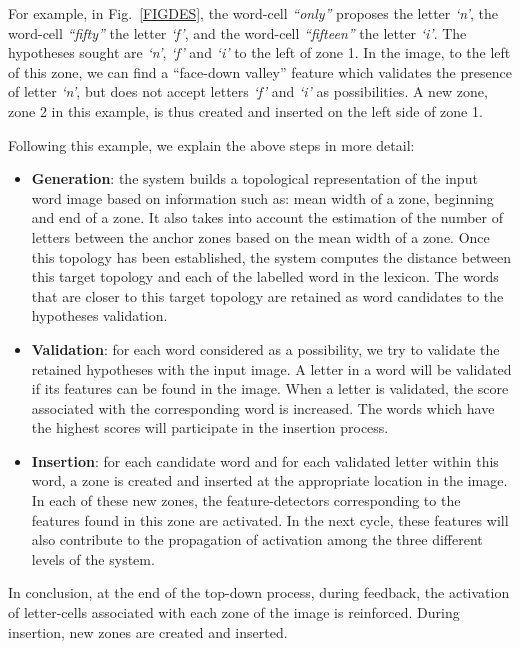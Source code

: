 \documentclass[ijdar]{svjour}
\begin{document}
For example, in Fig.~\ref{FIGDES}, the word-cell {\it ``only''} proposes the letter {\it `n'}, the word-cell {\it ``fifty''} the letter {\it `f'}, and the word-cell {\it ``fifteen''} the letter {\it `i'}.
The hypotheses sought are {\it `n'}, {\it `f'} and {\it `i'} to the left of zone 1.
In the image, to the left of this zone, we can find a ``face-down valley'' feature which validates the presence of letter {\it `n'}, but does not accept letters {\it `f'} and {\it `i'} as possibilities.
A new zone, zone 2 in this example, is thus created and inserted on the left side of zone 1.

Following this example, we explain the above steps in more detail:

\begin{itemize}
\item {\bf Generation}: the system builds a topological representation of the input word image based on information such as:  mean width of a zone, beginning and end of a zone.
It also takes into account the estimation of the number of letters between the anchor zones based on the mean width of a zone.
Once this topology has been established, the system computes the distance between this target topology and each of the labelled word in the lexicon.
The words that are closer to this target topology are retained as word candidates to the hypotheses validation.

\vskip 4mm

\item {\bf Validation}: for each word considered as a possibility, we try to validate the retained hypotheses with the input image.
A letter in a word will be validated if its features can be found in the image.
When a letter is validated, the score associated with the corresponding word is increased.
The words which have the highest scores will participate in the insertion process.

\vskip 4mm

\item {\bf Insertion}: for each candidate word and for each validated letter within this word, a zone is created and inserted at the appropriate location in the image.
In each of these new zones, the feature-detectors corresponding to the features found in this zone are activated.
In the next cycle, these features will also contribute to the propagation of activation among the three different levels of the system.
\end{itemize}

In conclusion, at the end of the top-down process, during feedback, the activation of letter-cells associated with each zone of the image is reinforced.
During insertion, new zones are created and inserted.
\end{document}
